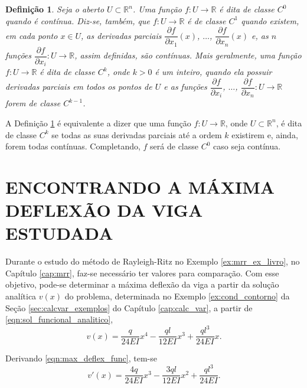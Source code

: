 \documentclass[
	12pt,				%
	openright,			%
    twoside,			%
	a4paper,			%
	chapter=TITLE,		%
	english,			%
	french,				%
	spanish,			%
	brazil				%
	]{abntex2}
\newtheorem{definicao}{Definição}
\numberwithin{lema}{chapter}
\numberwithin{teorema}{chapter}
\numberwithin{definicao}{chapter}
\numberwithin{exemplo}{chapter}
\numberwithin{figure}{chapter}
\begin{document}
\begin{apendicesenv}
{	\begin{definicao}
		\label{def:cap_conceitos_analise:classe_ck}
		Seja o aberto $U\subset\mathbb{R}^n$. Uma função $f:U\longrightarrow\mathbb{R}$ é dita de classe $C^0$ quando é contínua. Diz-se, também, que $f:U\longrightarrow\mathbb{R}$ é de classe $C^1$ quando existem, em cada ponto $x\in U$, as derivadas parciais $\dfrac{\partial f}{\partial x_1}(x)$, $\dots$, $\dfrac{\partial f}{\partial x_n}(x)$ e, as $n$ funções $\dfrac{\partial f}{\partial x_i}:U\longrightarrow \mathbb{R}$, assim definidas, são contínuas. Mais geralmente, uma função $f:U\longrightarrow\mathbb{R}$ é dita de classe $C^k$, onde $k>0$ é um inteiro, quando ela possuir derivadas parciais em todos os pontos de $U$ e as funções $\dfrac{\partial f}{\partial x_i}$, $\dots$, $\dfrac{\partial f}{\partial x_n}:U\longrightarrow \mathbb{R}$ forem de classe $C^{k-1}$.
	\end{definicao}
	
	A Definição \ref{def:cap_conceitos_analise:classe_ck} é equivalente a dizer que uma função $f:U\longrightarrow\mathbb{R}$, onde $U\subset\mathbb{R}^n$, é dita de classe $C^k$ se todas as suas derivadas parciais até a ordem $k$ existirem e, ainda, forem todas contínuas. Completando, $f$ será de classe $C^0$ caso seja contínua.
}

\chapter{ENCONTRANDO A MÁXIMA DEFLEXÃO DA VIGA ESTUDADA}
\label{apend:max_deflex}
{
	Durante o estudo do método de Rayleigh-Ritz no Exemplo \ref{ex:mrr_ex_livro}, no Capítulo \ref{cap:mrr}, faz-se necessário ter valores para comparação. Com esse objetivo, pode-se determinar a máxima deflexão da viga a partir da solução analítica $v(x)$ do problema, determinada no Exemplo \ref{ex:cond_contorno} da Seção \ref{sec:calcvar_exemplos} do Capítulo \ref{cap:calc_var}, a partir de \eqref{eqn:sol_funcional_analitico},
	\begin{equation}
	\label{eqn:max_deflex_func}
	v(x) = 
		\frac{q}{24EI} x^4
		-
		\frac{ql}{12EI} x^3
		+
		\frac{ql^3}{24EI} x
		\text{.}
	\end{equation}
	
	Derivando \eqref{eqn:max_deflex_func}, tem-se
	\begin{equation}
	\label{eqn:max_deflex_func_diff}
	v'(x) =
		\frac{4q}{24EI}x^3
		-
		\frac{3ql}{12EI}x^2
		+
		\frac{ql^3}{24EI}
		\text{.}
	\end{equation}
	
}
\end{apendicesenv}
\end{document}
